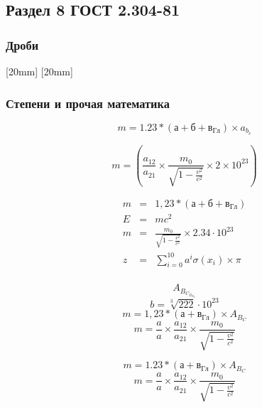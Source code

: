 \newpage
\subsection{Раздел 8 ГОСТ 2.304-81}

\subsubsection{Дроби}

{
  [20mm]
  [20mm]
}

\newpage
\subsubsection{Степени и прочая математика}
\makeatletter
\eskdfont \eskdfontsize{7mm} \selectfont \mdseries
\papergraduate

\[m = 1.23 * \left(а+б+в_{Гл}\right)\times a_{b_c}\]

\[m = \left( \frac{a_{12}}{a_{21}} \times \frac{m_0}{\sqrt{1-\frac{v^2}{c^2}}}\times 2 \times 10^{23} \right) \]

\begin{eqnarray}
  m &=& 1,23 * \left(а+б+в_{Гл}\right)\\
  E &=& mc^2\\
  m &=& \frac{m_0}{\sqrt{1-\frac{v^2}{c^2}}}\times 2.34 \cdot 10^{23}\\
  z &=& \sum_{i=0}^{10}a^i\sigma\left( x_i \right) \times \pi\\
\end{eqnarray}

\newpage
\eskdfont \eskdfontsize{14mm} \selectfont \mdseries
\papergraduate

\[A_{B_{C_{D_{E_{F}}}}}\]
\[b=\sqrt[3]{222} \cdot 10^{23} \] %
\[m = 1,23 * \left(а+в_{Гл}\right) \times A_{B_C}\]
\[m = \frac{a}{a}\times\frac{a_{12}}{a_{21}} \times \frac{m_0}{\sqrt{1-\frac{v^2}{c^2}}}\]

\eskdfont \eskdfontsize{3.5mm} \selectfont\mdseries
\[m = 1.23 * \left(а+в_{Гл}\right) \times A_{B_C}\]
\[m = \frac{a}{a}\times\frac{a_{12}}{a_{21}} \times \frac{m_0}{\sqrt{1-\frac{v^2}{c^2}}}\]

\makeatother

\newpage
